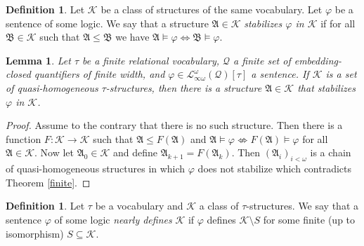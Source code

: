 \documentclass{ndjflart}
\theoremstyle{plain}
\newtheorem{lemma}[conjecture]{Lemma}
\theoremstyle{definition}
\newtheorem{definition}[conjecture]{Definition}
\numberwithin{equation}{section}
\begin{document}
\begin{definition}
Let $\mathcal{K}$ be a class of structures of the same vocabulary.
Let $\varphi$ be a sentence of some logic.
We say that a structure $\mathfrak{A}\in\mathcal{K}$
\emph{stabilizes $\varphi$ in $\mathcal{K}$} if for all
$\mathfrak{B} \in \mathcal{K}$ such that $\mathfrak{A}\leq\mathfrak{B}$ we have
$\mathfrak{A} \vDash \varphi \Leftrightarrow \mathfrak{B} \vDash \varphi$.
\end{definition}

\begin{lemma}\label{stabil}
Let $\tau$ be a finite relational vocabulary,
$\mathcal{Q}$ a finite set of embedding-closed quantifiers of finite width,
and $\varphi \in \mathcal{L}_{\infty\omega}^{\omega}(\mathcal{Q})[\tau]$ a sentence.
If $\mathcal{K}$ is a set of quasi-homogeneous $\tau$-structures, then there is
a structure $\mathfrak{A} \in \mathcal{K}$ that stabilizes $\varphi$ in $\mathcal{K}$.
\end{lemma}
\begin{proof}
Assume to the contrary that there is no such structure.
Then there is a function $F : \mathcal{K}\rightarrow\mathcal{K}$ such that
$\mathfrak{A} \leq F(\mathfrak{A})$ and
$\mathfrak{A} \vDash\varphi \nLeftrightarrow F(\mathfrak{A}) \vDash \varphi$ for
all $\mathfrak{A} \in \mathcal{K}$.
Now let $\mathfrak{A}_0 \in \mathcal{K}$ and define
$\mathfrak{A}_{k+1} = F(\mathfrak{A}_k)$.
Then $(\mathfrak{A}_i)_{i<\omega}$ is a chain of quasi-homogeneous structures in
which $\varphi$ does not stabilize which contradicts Theorem \ref{finite}.
\end{proof}

\begin{definition}
Let $\tau$ be a vocabulary and $\mathcal{K}$ a class of $\tau$-structures.
We say that a sentence $\varphi$ of some logic \emph{nearly defines}
$\mathcal{K}$ if $\varphi$ defines $\mathcal{K} \setminus S$ for some finite
(up to isomorphism) $S \subseteq \mathcal{K}$.
\end{definition}
\end{document}
